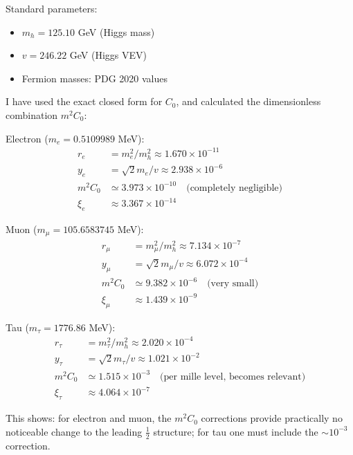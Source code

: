 	\begin{numerical}
		Standard parameters:
		\begin{itemize}
			\item $m_h = 125.10$ GeV (Higgs mass)
			\item $v = 246.22$ GeV (Higgs VEV)
			\item Fermion masses: PDG 2020 values
		\end{itemize}
		
		I have used the exact closed form for $C_0$, and calculated the dimensionless combination $m^2C_0$:
		
		Electron ($m_e = 0.5109989$ MeV):
		\begin{align}
			r_e &= m_e^2/m_h^2 \approx 1.670 \times 10^{-11}\\
			y_e &= \sqrt{2} m_e/v \approx 2.938 \times 10^{-6}\\
			m^2C_0 &\simeq 3.973 \times 10^{-10} \quad \text{(completely negligible)}\\
			\xi_e &\approx 3.367 \times 10^{-14}
		\end{align}
		
		Muon ($m_\mu = 105.6583745$ MeV):
		\begin{align}
			r_\mu &= m_\mu^2/m_h^2 \approx 7.134 \times 10^{-7}\\
			y_\mu &= \sqrt{2} m_\mu/v \approx 6.072 \times 10^{-4}\\
			m^2C_0 &\simeq 9.382 \times 10^{-6} \quad \text{(very small)}\\
			\xi_\mu &\approx 1.439 \times 10^{-9}
		\end{align}
		
		Tau ($m_\tau = 1776.86$ MeV):
		\begin{align}
			r_\tau &= m_\tau^2/m_h^2 \approx 2.020 \times 10^{-4}\\
			y_\tau &= \sqrt{2} m_\tau/v \approx 1.021 \times 10^{-2}\\
			m^2C_0 &\simeq 1.515 \times 10^{-3} \quad \text{(per mille level, becomes relevant)}\\
			\xi_\tau &\approx 4.064 \times 10^{-7}
		\end{align}
		
		This shows: for electron and muon, the $m^2C_0$ corrections provide practically no noticeable change to the leading $\frac{1}{2}$ structure; for tau one must include the $\sim 10^{-3}$ correction.
	\end{numerical}
